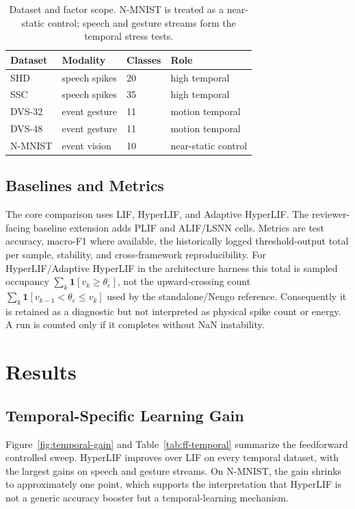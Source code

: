 \documentclass[journal]{IEEEtran}
\newcommand{\hlif}{HyperLIF}
\newcommand{\adhlif}{Adaptive HyperLIF}
\newcommand{\lif}{LIF}
\newcommand{\plif}{PLIF}
\newcommand{\alif}{ALIF}
\begin{document}
\begin{table}[t]
\centering
\caption{Dataset and factor scope. N-MNIST is treated as a near-static control; speech and gesture streams form the temporal stress tests.}
\label{tab:datasets}
\begin{tabular}{llll}
\toprule
Dataset & Modality & Classes & Role \\
\midrule
SHD & speech spikes & 20 & high temporal \\
SSC & speech spikes & 35 & high temporal \\
DVS-32 & event gesture & 11 & motion temporal \\
DVS-48 & event gesture & 11 & motion temporal \\
N-MNIST & event vision & 10 & near-static control \\
\bottomrule
\end{tabular}
\end{table}

\subsection{Baselines and Metrics}
The core comparison uses \lif{}, \hlif{}, and \adhlif{}. The reviewer-facing baseline extension adds \plif{} and \alif{}/LSNN cells. Metrics are test accuracy, macro-F1 where available, the historically logged threshold-output total per sample, stability, and cross-framework reproducibility. For \hlif{}/\adhlif{} in the architecture harness this total is sampled occupancy $\sum_k\mathbf{1}[v_k\geq\theta_e]$, not the upward-crossing count $\sum_k\mathbf{1}[v_{k-1}<\theta_e\leq v_k]$ used by the standalone/Nengo reference. Consequently it is retained as a diagnostic but not interpreted as physical spike count or energy. A run is counted only if it completes without NaN instability.

\section{Results}
\subsection{Temporal-Specific Learning Gain}
Figure~\ref{fig:temporal-gain} and Table~\ref{tab:ff-temporal} summarize the feedforward controlled sweep. \hlif{} improves over \lif{} on every temporal dataset, with the largest gains on speech and gesture streams. On N-MNIST, the gain shrinks to approximately one point, which supports the interpretation that \hlif{} is not a generic accuracy booster but a temporal-learning mechanism.
\end{document}
